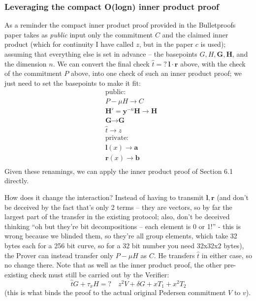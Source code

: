 \documentclass[10pt,a4paper]{article}
\begin{document}
\hypertarget{leveraging-the-compact-ologn-inner-product-proof}{%
\subsubsection[Leveraging the compact O(logn) inner product
proof]{\texorpdfstring{\protect\hypertarget{anchor-57}{}{}Leveraging the
compact O(logn) inner product
proof}{Leveraging the compact O(logn) inner product proof}}\label{leveraging-the-compact-ologn-inner-product-proof}}

As a reminder the compact inner product proof provided in the
Bulletproofs paper takes as \emph{public }input only the commitment $C$ and
the claimed inner product (which for continuity I have called $z$, but in
the paper $c$ is used); assuming that everything else is set in advance --
the basepoints $G, H, \mathbf{G}, \mathbf{H}$, and the dimension $n$. We can convert the final check $\hat{t} =? \ \textbf{l} \cdot \textbf{r}$
above, with the check of the commitment $P$ above, into one check of such an
inner product proof; we just need to set the basepoints to make it fit:
\begin{align*}
& \textrm{public:} \\
& P - \mu H \rightarrow C \\
& \textbf{H}' = \textbf{y}^{-n}\textbf{H} \rightarrow \textbf{H} \\
& \textbf{G} \rightarrow \textbf{G} \\
& \hat{t} \rightarrow z \\
& \textrm{private:} \\
& \textbf{l}(x) \rightarrow \textbf{a} \\
& \textbf{r}(x) \rightarrow \textbf{b} \\
\end{align*}
Given these renamings, we can apply the inner product proof of Section
6.1 directly.

How does it change the interaction? Instead of having to transmit $\mathbf{l}, \mathbf{r}$ (and
don't be deceived by the fact that's only 2 terms -- they are vectors,
so by far the largest part of the transfer in the existing protocol;
also, don't be deceived thinking ``oh but they're bit decompositions --
each element is 0 or 1!'' - this is wrong because we blinded them, so
they're all group elements, which take 32 bytes each for a 256 bit
curve, so for a 32 bit number you need 32x32x2 bytes), the Prover can
instead transfer only $P-\mu H$ as $C$. He transfers $\hat{t}$ in either case, so no change
there. Note that as well as the inner product proof, the other
pre-existing check must still be carried out by the Verifier:
\[\hat{t}G + \tau_x H =? \quad z^2V + \delta G + xT_1 + x^2T_2\]
(this is what binds the proof to the actual original Pedersen commitment $V$
to $v$).
\end{document}

